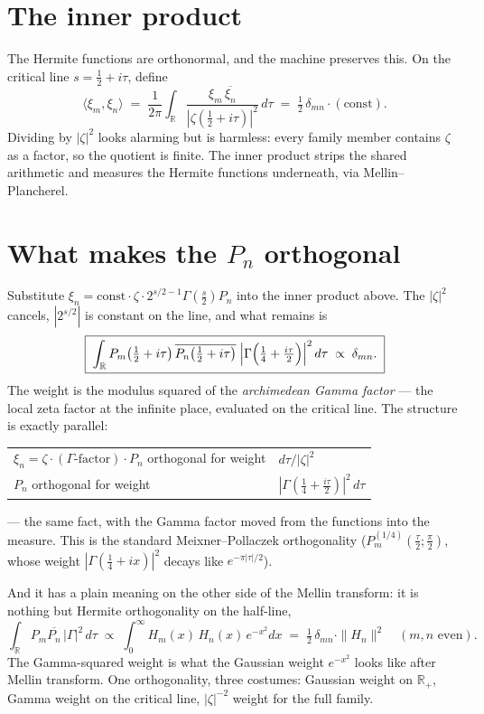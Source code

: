 \documentclass[11pt]{article}
\newcommand{\R}{\mathbb{R}}
\begin{document}
\section{The inner product}

The Hermite functions are orthonormal, and the machine preserves this. On the critical line $s = \tfrac12 + i\tau$, define
\[
\langle \xi_m, \xi_n \rangle
\;=\;
\frac{1}{2\pi}\int_\R
\frac{\xi_m\, \overline{\xi_n}}{|\zeta(\tfrac12+i\tau)|^2}\, d\tau
\;=\; \tfrac12\,\delta_{mn}\cdot(\text{const}).
\]
Dividing by $|\zeta|^2$ looks alarming but is harmless: every family member contains $\zeta$ as a factor, so the quotient is finite. The inner product strips the shared arithmetic and measures the Hermite functions underneath, via Mellin--Plancherel.

\section{What makes the $P_n$ orthogonal}

Substitute $\xi_n = \text{const} \cdot \zeta \cdot 2^{s/2-1}\Gamma(\tfrac s2) P_n$ into the inner product above. The $|\zeta|^2$ cancels, $|2^{s/2}|$ is constant on the line, and what remains is
\[
\boxed{\;
\int_\R P_m\bigl(\tfrac12+i\tau\bigr)\, \overline{P_n\bigl(\tfrac12+i\tau\bigr)}\;
\Bigl|\Gamma\Bigl(\tfrac14 + \tfrac{i\tau}{2}\Bigr)\Bigr|^2\, d\tau
\;\propto\; \delta_{mn}.
\;}
\]
The weight is the modulus squared of the \emph{archimedean Gamma factor} --- the local zeta factor at the infinite place, evaluated on the critical line. The structure is exactly parallel:
\begin{center}
\begin{tabular}{ll}
$\xi_n = \zeta \cdot (\Gamma\text{-factor}) \cdot P_n$ orthogonal for weight & $d\tau / |\zeta|^2$ \\[2pt]
$P_n$ orthogonal for weight & $|\Gamma(\tfrac14 + \tfrac{i\tau}{2})|^2\, d\tau$
\end{tabular}
\end{center}
--- the same fact, with the Gamma factor moved from the functions into the measure. This is the standard Meixner--Pollaczek orthogonality ($P^{(1/4)}_m(\tfrac\tau2; \tfrac\pi2)$, whose weight $|\Gamma(\tfrac14+ix)|^2$ decays like $e^{-\pi|\tau|/2}$).

And it has a plain meaning on the other side of the Mellin transform: it is nothing but Hermite orthogonality on the half-line,
\[
\int_\R P_m \overline{P_n}\, \bigl|\Gamma\bigr|^2\, d\tau
\;\propto\;
\int_0^\infty H_m(x)\, H_n(x)\, e^{-x^2} dx
\;=\; \tfrac12\, \delta_{mn} \cdot \|H_n\|^2
\quad (m, n \text{ even}).
\]
The Gamma-squared weight is what the Gaussian weight $e^{-x^2}$ looks like after Mellin transform. One orthogonality, three costumes: Gaussian weight on $\R_+$, Gamma weight on the critical line, $|\zeta|^{-2}$ weight for the full family.
\end{document}
